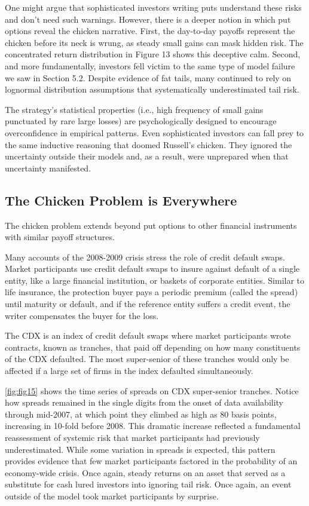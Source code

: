 One might argue that sophisticated investors writing puts understand these risks and don't need such warnings. However, there is a deeper notion in which put options reveal the chicken narrative. First, the day-to-day payoffs represent the chicken before its neck is wrung, as steady small gains can mask hidden risk. The concentrated return distribution in Figure 13 shows this deceptive calm. Second, and more fundamentally, investors fell victim to the same type of model failure we saw in Section 5.2. Despite evidence of fat tails, many continued to rely on lognormal distribution assumptions that systematically underestimated tail risk.

The strategy's statistical properties (i.e., high frequency of small gains punctuated by rare large losses) are psychologically designed to encourage overconfidence in empirical patterns. Even sophisticated investors can fall prey to the same inductive reasoning that doomed Russell's chicken. They ignored the uncertainty outside their models and, as a result, were unprepared when that uncertainty manifested.


\subsection{The Chicken Problem is Everywhere}
The chicken problem extends beyond put options to other financial instruments with similar payoff structures.

Many accounts of the 2008-2009 crisis stress the role of credit default swaps. Market participants use credit default swaps to insure against default of a single entity, like a large financial institution, or baskets of corporate entities. Similar to life insurance, the protection buyer pays a periodic premium (called the spread) until maturity or default, and if the reference entity suffers a credit event, the writer compensates the buyer for the loss.

The CDX is an index of credit default swaps where market participants wrote contracts, known as tranches, that paid off depending on how many constituents of the CDX defaulted. The most super-senior of these tranches would only be affected if a large set of firms in the index defaulted simultaneously. 

\autoref{fig:fig15} \citep{seo2018rare} shows the time series of spreads on CDX super-senior tranches. Notice how spreads remained in the single digits from the onset of data availability through mid-2007, at which point they climbed as high as 80 basis points, increasing in 10-fold before 2008. This dramatic increase reflected a fundamental reassessment of systemic risk that market participants had previously underestimated. While some variation in spreads is expected, this pattern provides evidence that few market participants factored in the probability of an economy-wide crisis. Once again, steady returns on an asset that served as a substitute for cash lured investors into ignoring tail risk. Once again, an event outside of the model took market participants by surprise. 

